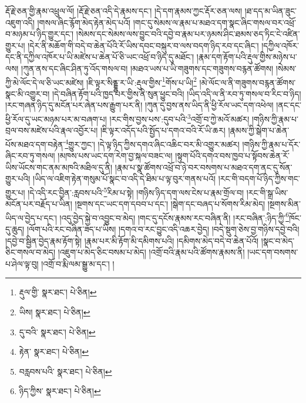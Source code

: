 རྡོ་རྗེ་ཅན་གྱི་རྣམ་འཕྲུལ་ལོ། །རྡོ་རྗེ་ཅན་འདི་དེ་རྣམས་དང་། །དེ་དག་རྣམས་ཀྱང་རྡོར་ཅན་ལས། །ཐ་དད་མ་ཡིན་ཟུང་འཇུག་འདི། །གསལ་ཞིང་རྙོག་མེད་རྟེན་མེད་པའོ། །གང་དུ་སེམས་ལ་རྣམ་པ་མཐའ་དག་སྣང་ཞིང་གསལ་བར་འཕྲོ་བ་མཉམ་པ་ཉིད་གྱུར་དང་། །སེམས་དང་སེམས་ལས་བྱུང་བའི་དབྱེ་བ་རྣམ་པར་ཉམས་ཤིང་ཐམས་ཅད་ཏིང་ངེ་འཛིན་གྱུར་པ། །དེར་ནི་མཆོག་གི་བདེ་བ་ཆེན་པོའི་རོ་ཡིས་དབང་བསྐུར་བ་ལས་བདག་ཉིད་རབ་དང་ཞིང་། །དཀྱིལ་འཁོར་དང་ནི་དཀྱིལ་འཁོར་པ་ཡི་མཛེས་པ་ཆེན་པོ་ཅི་ཡང་འཕྲོ་བ་ཉིད་དུ་མཐོང་། །རྣམ་དག་རྟོག་པའི་རྡུལ་གྱིས་མཉེས་པ་ལས། །ཀུན་ནས་དང་ཞིང་ཤིན་ཏུ་འོད་གསལ་བ། །མཐའ་ཡས་པ་ཡི་གཟུགས་དང་གཟུགས་བརྙན་ཚོགས། །སེམས་ཀྱི་མེ་ལོང་དེ་ལ་ཅི་ཡང་མཛེས། །ཇི་ལྟར་སིནྡྷུ་ར་ཡི་:རྡུལ་གྱིས་\footnote{རྡུལ་གྱི་  སྣར་ཐང་།  པེ་ཅིན། }གོས་པ་ཡི།\footnote{ཡིས།  སྣར་ཐང་།  པེ་ཅིན། } །མེ་ལོང་ལ་ནི་གཟུགས་བརྙན་ཚོགས་སྣང་མི་འགྱུར་བ། །དེ་བཞིན་རྟོག་པའི་ཁྱད་པར་གྱིས་ནི་སུན་ཕྱུང་བའི། །ཡིད་འདི་ལ་ནི་རབ་ཏུ་གསལ་བ་རིང་བ་ཉིད། །རང་གཞན་ཉིད་དུ་མངོན་པར་ཞེན་པས་རྒྱུག་པར་ནི། །ཀུན་དུ་བྱས་ནས་ཡིད་ནི་ཕྱི་རོལ་ཡང་དག་འཕེལ། །ནང་དང་ཕྱི་རོལ་དུ་ཡང་མཉམ་པར་མ་བཞག་པ། །རང་གིས་བྱས་པས་:དུབ་པའི་\footnote{དུ་བའི་  སྣར་ཐང་།  པེ་ཅིན། }འགྲོ་བ་ཀྱེ་མའོ་མཚར། །གཉིས་ཀྱི་རྣམ་པ་བྲལ་བས་མཛེས་པའི་རྣལ་འབྱོར་པ། །ཇི་ལྟར་འདོད་པའི་སྤྱོད་པ་དགའ་བའི་རོ་ཡི་ཆར། །རྣམས་ཀྱི་སྒེག་པ་ཆེན་པོས་མཐའ་དག་བརྟེན་\footnote{རྟེན་  སྣར་ཐང་།  པེ་ཅིན། }གྱུར་ཀྱང་། །དེ་ལྟ་ཉིད་ཀྱིས་དགའ་ཞིང་འཆིང་བར་མི་འགྱུར་མཚར། །གཉིས་ཀྱི་རྣམ་པ་དོར་ཞིང་རབ་ཏུ་གསལ། །མཁས་པས་ཡང་དག་རེག་བྱ་སྐལ་བཟང་ལ། །སྟུག་པོའི་དགའ་བས་ཁྱབ་པ་སྟོབས་ཆེན་རོ་ཡིས་ཡོངས་གང་ནམ་མཁའི་མཐིལ་དུ་ནི། །རྣམ་པ་སྣ་ཚོགས་འཕྲོ་བ་ཉེ་བར་བསགས་པ་མཐའ་དག་ནང་དུ་སོན་གྱུར་པའི། །ཡིད་ལ་འཇིག་རྟེན་གསུམ་པོ་སྣང་བ་འདི་དེ་ཐིམ་པ་ལྟ་བུར་གནས་པའོ། །རང་གི་བདག་པོ་ཉིད་ཀྱིས་གང་གྱུར་པ། །དེ་འདི་རང་བྱིན་:རླབས་པའི་\footnote{བརླབས་པའི་  སྣར་ཐང་།  པེ་ཅིན། }རིམ་པ་སྟེ། །གཉིས་ཉིད་དག་ལས་ངེས་པ་རྣམ་གྲོལ་བ། །རང་གི་སྒྲ་ཡིས་མངོན་པར་བརྗོད་པ་ཡིན། །སྔགས་དང་ཡང་དག་དབབ་པ་དང་། །སྒེག་དང་བཞད་པ་སོགས་རིམ་མེད། །སྔགས་མིན་ཡིད་ལ་བྱེད་པ་དང་། །འདུ་བྱེད་སྐྱེ་བ་འབྱུང་བ་མེད། །གང་དུ་དངོས་རྣམས་རང་བཞིན་ནི། །རང་བཞིན་:ཉིད་ཀྱི་\footnote{ཉིད་ཀྱིས་  སྣར་ཐང་།  པེ་ཅིན། }ཁོང་དུ་ཆུད། །ལོག་པའི་རང་བཞིན་ཟད་པ་ཡིས། །དགའ་བ་རང་བྱུང་འདི་འཆར་བྱེད། །བདེ་སྡུག་ཅེས་བྱ་གཉིས་དབྱེ་བའི། །དབྱེ་བ་སྦྱིན་བྱེད་རྣམ་རྟོག་སྟེ། །རྣམ་པར་མི་རྟོག་མི་དམིགས་པའི། །དམིགས་མེད་བདེ་བ་ཆེན་པོའོ། །སྣང་བ་མེད་ཅིང་གསལ་བ་མེད། །འཇུག་པ་མེད་ཅིང་བསམ་པ་མེད། །འགྲོ་བའི་རྣམ་པའི་ཚོགས་རྣམས་ནི། །ཡང་དག་བསགས་པ་ཤེལ་ལྟ་བུ། །འགྲོ་བ་རྨི་ལམ་སྒྱུ་མ་དང་། །
